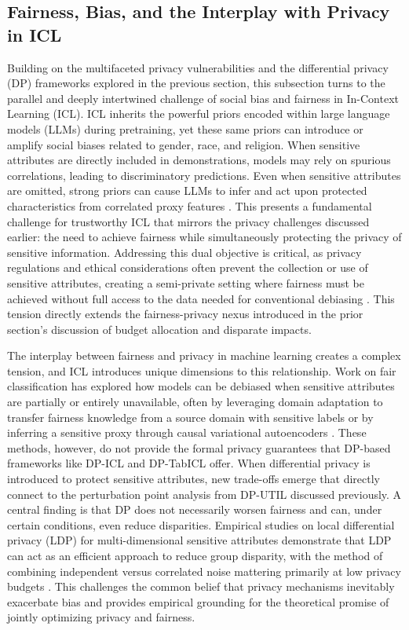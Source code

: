 \documentclass[11pt]{article}
\begin{document}
\subsection{Fairness, Bias, and the Interplay with Privacy in ICL}

Building on the multifaceted privacy vulnerabilities and the differential privacy (DP) frameworks explored in the previous section, this subsection turns to the parallel and deeply intertwined challenge of social bias and fairness in In-Context Learning (ICL). ICL inherits the powerful priors encoded within large language models (LLMs) during pretraining, yet these same priors can introduce or amplify social biases related to gender, race, and religion. When sensitive attributes are directly included in demonstrations, models may rely on spurious correlations, leading to discriminatory predictions. Even when sensitive attributes are omitted, strong priors can cause LLMs to infer and act upon protected characteristics from correlated proxy features \cite{ref464}. This presents a fundamental challenge for trustworthy ICL that mirrors the privacy challenges discussed earlier: the need to achieve fairness while simultaneously protecting the privacy of sensitive information. Addressing this dual objective is critical, as privacy regulations and ethical considerations often prevent the collection or use of sensitive attributes, creating a semi-private setting where fairness must be achieved without full access to the data needed for conventional debiasing \cite{ref465,ref466}. This tension directly extends the fairness-privacy nexus introduced in the prior section's discussion of budget allocation and disparate impacts.

The interplay between fairness and privacy in machine learning creates a complex tension, and ICL introduces unique dimensions to this relationship. Work on fair classification has explored how models can be debiased when sensitive attributes are partially or entirely unavailable, often by leveraging domain adaptation to transfer fairness knowledge from a source domain with sensitive labels \cite{ref467} or by inferring a sensitive proxy through causal variational autoencoders \cite{ref466}. These methods, however, do not provide the formal privacy guarantees that DP-based frameworks like DP-ICL and DP-TabICL offer. When differential privacy is introduced to protect sensitive attributes, new trade-offs emerge that directly connect to the perturbation point analysis from DP-UTIL discussed previously. A central finding is that DP does not necessarily worsen fairness and can, under certain conditions, even reduce disparities. Empirical studies on local differential privacy (LDP) for multi-dimensional sensitive attributes demonstrate that LDP can act as an efficient approach to reduce group disparity, with the method of combining independent versus correlated noise mattering primarily at low privacy budgets \cite{ref468,ref469}. This challenges the common belief that privacy mechanisms inevitably exacerbate bias and provides empirical grounding for the theoretical promise of jointly optimizing privacy and fairness.
\end{document}
